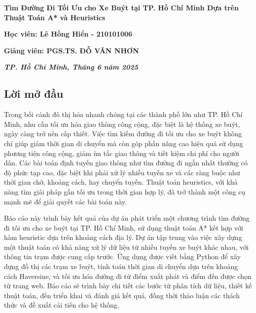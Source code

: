 \documentclass[a4paper,12pt]{article}
\begin{document}
\begin{titlepage}
\begin{center}
        {\huge\bfseries Tìm Đường Đi Tối Ưu cho Xe Buýt tại TP. Hồ Chí Minh Dựa trên Thuật Toán A* và Heuristics \par}
        
        \vspace{2cm}
        {\bfseries\large Học viên: Lê Hồng Hiển - 210101006 \par}
        \vspace{0.5cm}
        {\bfseries\large Giảng viên: PGS.TS. ĐỖ VĂN NHƠN \par}
        \vspace{4cm}
        {\bfseries\itshape\large TP. Hồ Chí Minh, Tháng 6 năm 2025 \par}
    \end{center}
    \restoregeometry
\end{titlepage}

\newpage
\begin{center}
\section*{Lời mở đầu}
\end{center}
Trong bối cảnh đô thị hóa nhanh chóng tại các thành phố lớn như TP. Hồ Chí Minh, nhu cầu tối ưu hóa giao thông công cộng, đặc biệt là hệ thống xe buýt, ngày càng trở nên cấp thiết. Việc tìm kiếm đường đi tối ưu cho xe buýt không chỉ giúp giảm thời gian di chuyển mà còn góp phần nâng cao hiệu quả sử dụng phương tiện công cộng, giảm ùn tắc giao thông và tiết kiệm chi phí cho người dân. Các bài toán định tuyến giao thông như tìm đường đi ngắn nhất thường có độ phức tạp cao, đặc biệt khi phải xử lý nhiều tuyến xe và các ràng buộc như thời gian chờ, khoảng cách, hay chuyển tuyến. Thuật toán heuristics, với khả năng tìm giải pháp gần tối ưu trong thời gian hợp lý, đã trở thành một công cụ mạnh mẽ để giải quyết các bài toán này.

Báo cáo này trình bày kết quả của dự án phát triển một chương trình tìm đường đi tối ưu cho xe buýt tại TP. Hồ Chí Minh, sử dụng thuật toán A* kết hợp với hàm heuristic dựa trên khoảng cách địa lý. Dự án tập trung vào việc xây dựng một thuật toán có khả năng xử lý dữ liệu từ nhiều tuyến xe buýt khác nhau, với thông tin trạm được cung cấp trước. Ứng dụng được viết bằng Python để xây dựng đồ thị các trạm xe buýt, tính toán thời gian di chuyển dựa trên khoảng cách Haversine, và tối ưu hóa đường đi từ điểm xuất phát và điểm đến được chọn từ trang web. Báo cáo sẽ trình bày chi tiết các bước từ phân tích dữ liệu, thiết kế thuật toán, đến triển khai và đánh giá kết quả, đồng thời thảo luận các thách thức và đề xuất cải tiến cho hệ thống.
\end{document}
